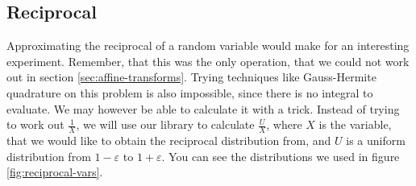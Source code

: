 \documentclass[11pt,a4paper]{book}
\begin{document}
\subsection{Reciprocal}

Approximating the reciprocal of a random variable would make for an interesting
experiment. Remember, that this was the only operation, that we could not work
out in section \ref{sec:affine-transforms}. Trying techniques like Gauss-Hermite
quadrature on this problem is also impossible, since there is no integral to
evaluate. We may however be able to calculate it with a trick. Instead of trying
to work out $\frac{1}{X}$, we will use our library to calculate $\frac{U}{X}$,
where $X$ is the variable, that we would like to obtain the reciprocal
distribution from, and $U$ is a uniform distribution from $1 - \varepsilon$ to
$1 + \varepsilon$. You can see the distributions we used in figure
\ref{fig:reciprocal-vars}.
\end{document}
